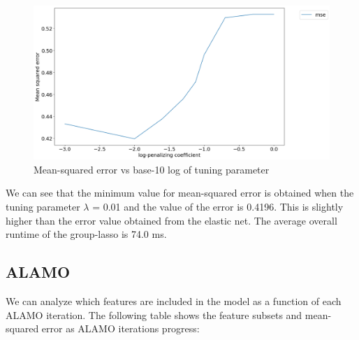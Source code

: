 \documentclass[a4paper,12pt]{article}
\begin{document}
\begin{figure}[H]
 \centering
 \includegraphics[scale=0.3]{mse-lambda-grplasso.png}
  \caption{Mean-squared error vs base-10 log of tuning parameter}
  \label{fig:neurons}
\end{figure}
\noindent We can see that the minimum value for mean-squared error is obtained when the tuning parameter $\lambda$ = 0.01 and the value of the error is 0.4196. This is slightly higher than the error value obtained from the elastic net. The average overall runtime of the group-lasso is 74.0 ms.

\newpage

\newpage
\subsection{ALAMO}
We can analyze which features are included in the model as a function of each ALAMO iteration. The following table shows the feature subsets and mean-squared error as ALAMO iterations progress:

\begin{table}[H]
\centering
{}
\caption{Solution paths of ALAMO}

\end{table}
\end{document}
